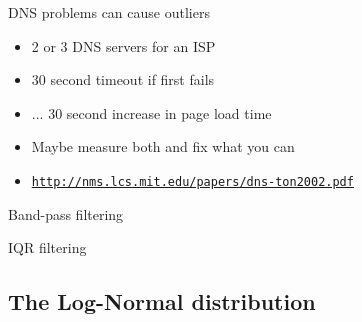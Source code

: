 \documentclass{beamer}
\begin{document}
\begin{frame}{DNS problems can cause outliers}
  \begin{itemize}
  \item 2 or 3 DNS servers for an ISP
  \item 30 second timeout if first fails
  \item ... 30 second increase in page load time
  \item Maybe measure both and fix what you can
  \item \href{http://nms.lcs.mit.edu/papers/dns-ton2002.pdf}{\scriptsize{\texttt{http://nms.lcs.mit.edu/papers/dns-ton2002.pdf}}}
  \end{itemize}
\end{frame}

\begin{frame}{Band-pass filtering}
\end{frame} 

\begin{frame}{IQR filtering}
\end{frame}

\subsection{The Log-Normal distribution}
\end{document}
